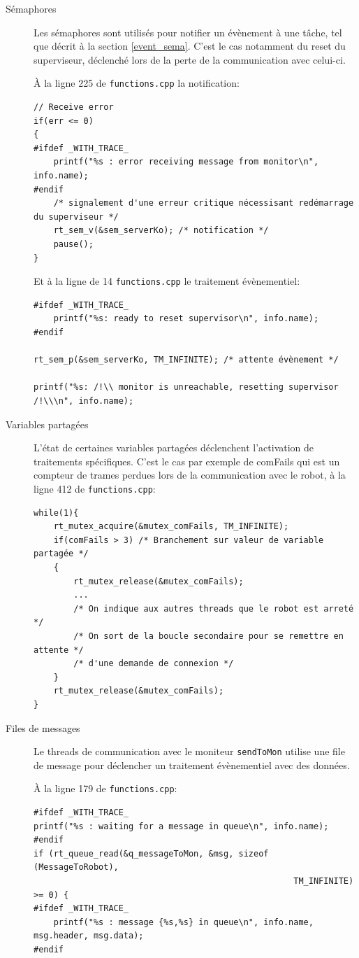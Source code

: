 \documentclass[11pt, a4paper]{paper}
\begin{document}
\begin{description}
\item[Sémaphores] Les sémaphores sont utilisés pour notifier un évènement à une tâche, tel que décrit à la section \ref{event_sema}. C'est le cas notamment du reset du superviseur, déclenché lors de la perte de la communication avec celui-ci.

À la ligne 225 de {\tt functions.cpp} la notification:
\begin{verbatim}
// Receive error
if(err <= 0)
{
#ifdef _WITH_TRACE_
    printf("%s : error receiving message from monitor\n", info.name);
#endif
    /* signalement d'une erreur critique nécessisant redémarrage du superviseur */
    rt_sem_v(&sem_serverKo); /* notification */
    pause();
}
\end{verbatim}

Et à la ligne de 14 {\tt functions.cpp} le traitement évènementiel:
\begin{verbatim}
#ifdef _WITH_TRACE_
    printf("%s: ready to reset supervisor\n", info.name);
#endif
    
rt_sem_p(&sem_serverKo, TM_INFINITE); /* attente évènement */

printf("%s: /!\\ monitor is unreachable, resetting supervisor /!\\\n", info.name);
\end{verbatim}

\item[Variables partagées] L'état de certaines variables partagées déclenchent l'activation de traitements spécifiques. C'est le cas par exemple de comFails qui est un compteur de trames perdues lors de la communication avec le robot, à la ligne 412 de {\tt functions.cpp}:

\begin{verbatim}
while(1){
    rt_mutex_acquire(&mutex_comFails, TM_INFINITE);
    if(comFails > 3) /* Branchement sur valeur de variable partagée */
    {
        rt_mutex_release(&mutex_comFails);
        ...
        /* On indique aux autres threads que le robot est arreté */
        /* On sort de la boucle secondaire pour se remettre en attente */
        /* d'une demande de connexion */
    }                
    rt_mutex_release(&mutex_comFails);
}
\end{verbatim}

\item[Files de messages] Le threads de communication avec le moniteur {\tt sendToMon} utilise une file de message pour déclencher un traitement évènementiel avec des données.

À la ligne 179 de {\tt functions.cpp}:
\begin{verbatim}
#ifdef _WITH_TRACE_
printf("%s : waiting for a message in queue\n", info.name);
#endif
if (rt_queue_read(&q_messageToMon, &msg, sizeof (MessageToRobot),
                                                    TM_INFINITE) >= 0) {
#ifdef _WITH_TRACE_
    printf("%s : message {%s,%s} in queue\n", info.name, msg.header, msg.data);
#endif
\end{verbatim}
\end{description}
\end{document}
